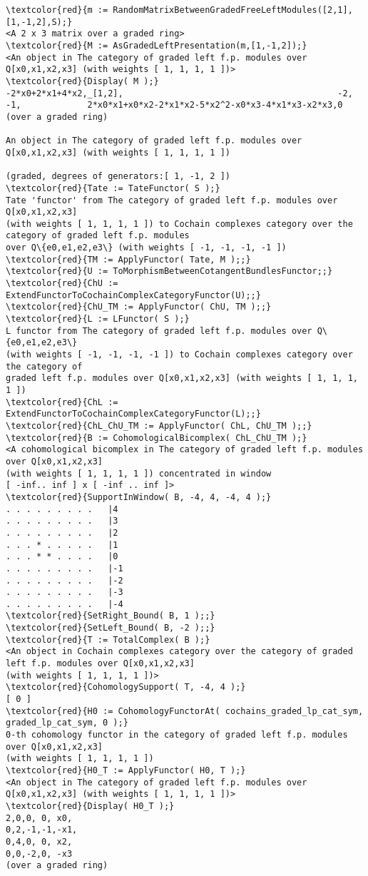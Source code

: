 \documentclass[16pt,a4paper]{extarticle}
\theoremstyle{definition}
\begin{document}
\begin{Verbatim}[commandchars=\\\{\}]
\textcolor{red}{m := RandomMatrixBetweenGradedFreeLeftModules([2,1],[1,-1,2],S);}
<A 2 x 3 matrix over a graded ring>
\textcolor{red}{M := AsGradedLeftPresentation(m,[1,-1,2]);}
<An object in The category of graded left f.p. modules over Q[x0,x1,x2,x3] (with weights [ 1, 1, 1, 1 ])>
\textcolor{red}{Display( M );}
-2*x0+2*x1+4*x2,_[1,2],                                          -2,
-1,             2*x0*x1+x0*x2-2*x1*x2-5*x2^2-x0*x3-4*x1*x3-x2*x3,0  
(over a graded ring)

An object in The category of graded left f.p. modules over Q[x0,x1,x2,x3] (with weights [ 1, 1, 1, 1 ])

(graded, degrees of generators:[ 1, -1, 2 ])
\textcolor{red}{Tate := TateFunctor( S );}
Tate 'functor' from The category of graded left f.p. modules over Q[x0,x1,x2,x3] 
(with weights [ 1, 1, 1, 1 ]) to Cochain complexes category over the category of graded left f.p. modules 
over Q\{e0,e1,e2,e3\} (with weights [ -1, -1, -1, -1 ])
\textcolor{red}{TM := ApplyFunctor( Tate, M );;}
\textcolor{red}{U := ToMorphismBetweenCotangentBundlesFunctor;;}
\textcolor{red}{ChU := ExtendFunctorToCochainComplexCategoryFunctor(U);;}
\textcolor{red}{ChU_TM := ApplyFunctor( ChU, TM );;}
\textcolor{red}{L := LFunctor( S );}
L functor from The category of graded left f.p. modules over Q\{e0,e1,e2,e3\} 
(with weights [ -1, -1, -1, -1 ]) to Cochain complexes category over the category of 
graded left f.p. modules over Q[x0,x1,x2,x3] (with weights [ 1, 1, 1, 1 ])
\textcolor{red}{ChL := ExtendFunctorToCochainComplexCategoryFunctor(L);;}
\textcolor{red}{ChL_ChU_TM := ApplyFunctor( ChL, ChU_TM );;}
\textcolor{red}{B := CohomologicalBicomplex( ChL_ChU_TM );}
<A cohomological bicomplex in The category of graded left f.p. modules over Q[x0,x1,x2,x3] 
(with weights [ 1, 1, 1, 1 ]) concentrated in window 
[ -inf.. inf ] x [ -inf .. inf ]>
\textcolor{red}{SupportInWindow( B, -4, 4, -4, 4 );}
. . . . . . . . .   |4
. . . . . . . . .   |3
. . . . . . . . .   |2
. . . * . . . . .   |1
. . . * * . . . .   |0
. . . . . . . . .   |-1
. . . . . . . . .   |-2
. . . . . . . . .   |-3
. . . . . . . . .   |-4
\textcolor{red}{SetRight_Bound( B, 1 );;}
\textcolor{red}{SetLeft_Bound( B, -2 );;}
\textcolor{red}{T := TotalComplex( B );}
<An object in Cochain complexes category over the category of graded left f.p. modules over Q[x0,x1,x2,x3] 
(with weights [ 1, 1, 1, 1 ])>
\textcolor{red}{CohomologySupport( T, -4, 4 );}
[ 0 ]
\textcolor{red}{H0 := CohomologyFunctorAt( cochains_graded_lp_cat_sym, graded_lp_cat_sym, 0 );}
0-th cohomology functor in the category of graded left f.p. modules over Q[x0,x1,x2,x3] 
(with weights [ 1, 1, 1, 1 ])
\textcolor{red}{H0_T := ApplyFunctor( H0, T );}
<An object in The category of graded left f.p. modules over Q[x0,x1,x2,x3] (with weights [ 1, 1, 1, 1 ])>
\textcolor{red}{Display( H0_T );}
2,0,0, 0, x0, 
0,2,-1,-1,-x1,
0,4,0, 0, x2, 
0,0,-2,0, -x3 
(over a graded ring)


\end{Verbatim}
\end{document}
